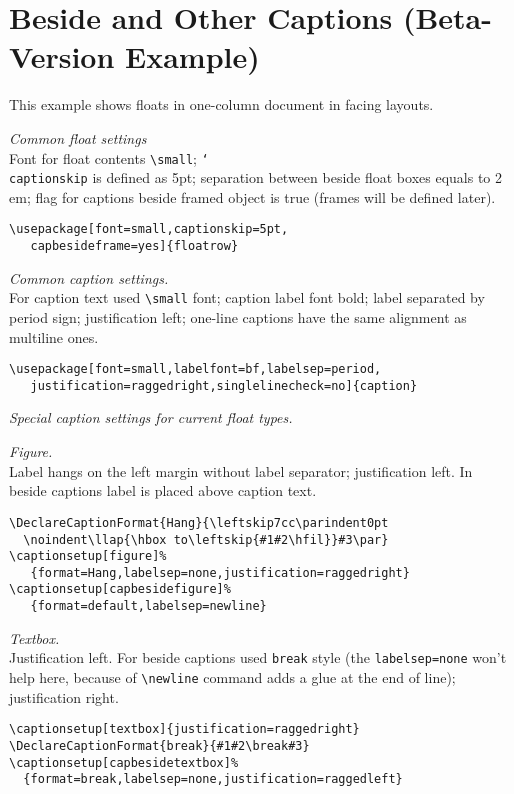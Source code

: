 \documentclass{book}
\providecommand*{\com}[1]{\texttt{\char`\\#1}}
\begin{document}
\chapter{Beside and Other Captions (Beta-Version Example)}

\begin{sl}
This example shows floats in one-column document in facing layouts.

\emph{Common float settings}\\
Font for float contents \verb|\small|;
\com{captionskip} is defined as 5pt;
separation between beside float boxes equals to 2\,em;
flag for captions beside framed object is true (frames will be defined later).
\begin{verbatim}
\usepackage[font=small,captionskip=5pt,
   capbesideframe=yes]{floatrow}
\end{verbatim}

\emph{Common caption settings.}\\
For caption text used \verb|\small| font;
caption label font bold;
label separated by period sign;
justification left;
one-line captions have the same alignment as multiline ones.
\begin{verbatim}
\usepackage[font=small,labelfont=bf,labelsep=period,
   justification=raggedright,singlelinecheck=no]{caption}
\end{verbatim}

\emph{Special caption settings for current float types.}

\emph{Figure.}\\
Label hangs on the left margin without label separator; justification left.
In beside captions label is placed above caption text.
\begin{verbatim}
\DeclareCaptionFormat{Hang}{\leftskip7cc\parindent0pt
  \noindent\llap{\hbox to\leftskip{#1#2\hfil}}#3\par}
\captionsetup[figure]%
   {format=Hang,labelsep=none,justification=raggedright}
\captionsetup[capbesidefigure]%
   {format=default,labelsep=newline}
\end{verbatim}

\emph{Textbox.}\\
Justification left.
For beside captions used \texttt{break} style (the \texttt{labelsep=none} won't help here, because of
\verb|\newline| command adds a glue at the end of line); justification right.
\begin{verbatim}
\captionsetup[textbox]{justification=raggedright}
\DeclareCaptionFormat{break}{#1#2\break#3}
\captionsetup[capbesidetextbox]%
  {format=break,labelsep=none,justification=raggedleft}
\end{verbatim}


\end{sl}
\end{document}

